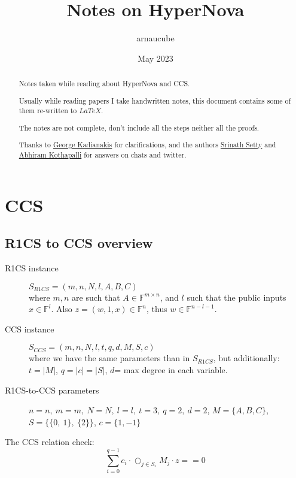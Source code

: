 \documentclass{article}
\title{Notes on HyperNova}
\author{arnaucube}
\date{May 2023}
\theoremstyle{definition}
\begin{document}
\maketitle

\begin{abstract}
	Notes taken while reading about HyperNova \cite{cryptoeprint:2023/573} and CCS\cite{cryptoeprint:2023/552}.

	Usually while reading papers I take handwritten notes, this document contains some of them re-written to $LaTeX$.

	The notes are not complete, don't include all the steps neither all the proofs.

	Thanks to \href{https://twitter.com/asn_d6}{George Kadianakis} for clarifications, and the authors \href{https://twitter.com/srinathtv}{Srinath Setty} and \href{https://twitter.com/abhiramko}{Abhiram Kothapalli} for answers on chats and twitter.
\end{abstract}

\tableofcontents


\section{CCS}
\subsection{R1CS to CCS overview}

\begin{description}
	\item[R1CS instance] $S_{R1CS} = (m, n, N, l, A, B, C)$\\
		where $m, n$ are such that $A \in \mathbb{F}^{m \times n}$, and $l$ such that the public inputs $x \in \mathbb{F}^l$. Also $z=(w, 1, x) \in \mathbb{F}^n$, thus $w \in \mathbb{F}^{n-l-1}$.
	\item[CCS instance] $S_{CCS} = (m, n, N, l, t, q, d, M, S, c)$\\
		where we have the same parameters than in $S_{R1CS}$, but additionally:\\
		$t=|M|$, $q = |c| = |S|$, $d$= max degree in each variable.
	\item[R1CS-to-CCS parameters] $n=n,~ m=m,~ N=N,~ l=l,~ t=3,~ q=2,~ d=2$, $M=\{A,B,C\}$, $S=\{\{0,~1\},~ \{2\}\}$, $c=\{1,-1\}$
\end{description}

The CCS relation check:
$$\sum_{i=0}^{q-1} c_i \cdot \bigcirc_{j \in S_i} M_j \cdot z ==0$$
\end{document}
